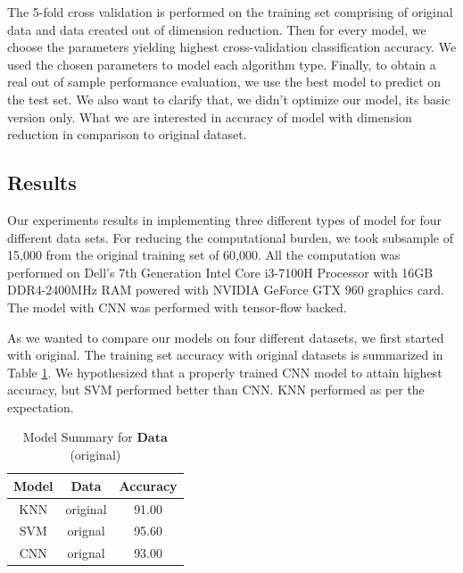 The 5-fold cross validation is performed on the training set comprising of original data and data created out of dimension reduction. Then for every model, we choose the parameters yielding highest cross-validation classification accuracy. We used the chosen parameters to model each algorithm type. Finally, to obtain a real out of sample performance evaluation, we use the best model to predict on the test set. We also want to clarify that, we didn't optimize our model, its basic version only. What we are interested in accuracy of model with dimension reduction in comparison to original dataset.

\subsection{Results}

Our experiments results in implementing three different types of model for four different data sets. For reducing the computational burden, we took subsample of 15,000 from the original training set of 60,000. All the computation was performed on Dell's 7th Generation Intel Core i3-7100H Processor with 16GB DDR4-2400MHz RAM powered with NVIDIA GeForce GTX 960 graphics card. The model with CNN was performed with tensor-flow backed.

As we wanted to compare our models on four different datasets, we first started with original. The training set accuracy with original datasets is summarized in Table \ref{R:ORG}. We hypothesized that a properly trained CNN model to attain highest accuracy, but SVM performed better than CNN. KNN performed as per the expectation.

\begin{table}[ht!]
\caption{Model Summary for $\mathbf{Data}$(original)}
\centering
\begin{tabular}{c c c }
\hline\hline
Model & Data & Accuracy\\ [0.5ex]
\hline
KNN & original& 91.00 \\
SVM & orignal & 95.60 \\
CNN & orignal & 93.00\\ [1ex]
\hline
\end{tabular}
\label{R:ORG}
\end{table}

